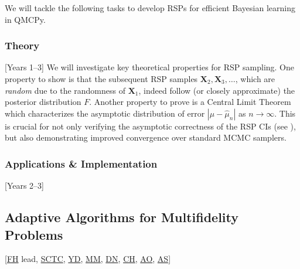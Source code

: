 \documentclass[11pt]{NSFamsart}
\newcommand{\cmtS}[1]{{\color{blue}{(Simon: #1)}}}
\newcommand{\FH}{\hyperlink{FHlink}{FH}\xspace}
\newcommand{\SM}{\hyperlink{SMlink}{SM}\xspace}
\newcommand{\SCTC}{\hyperlink{SCTClink}{SCTC}\xspace}
\newcommand{\AO}{\hyperlink{AOlink}{AO}\xspace}
\newcommand{\MM}{\hyperlink{MMlink}{MM}\xspace}
\newcommand{\CH}{\hyperlink{CHlink}{CH}\xspace}
\newcommand{\YD}{\hyperlink{YDlink}{YD}\xspace}
\newcommand{\AS}{\hyperlink{ASlink}{AS}\xspace}
\newcommand{\DN}{\hyperlink{DNlink}{DN}\xspace}
\newcommand{\bX}{{\boldsymbol{X}}}
\newcommand{\SMNote}[1]{{\color{blue}Simon: #1}}
\begin{document}
We will tackle the following tasks to develop RSPs for efficient Bayesian learning in QMCPy.
\subsubsection{Theory} [Years 1--3]
We will investigate key theoretical properties for RSP sampling. One property to show is that the subsequent RSP samples $\bX_2, \bX_3, \ldots$, which are \textit{random} due to the randomness of $\bX_1$, indeed follow (or closely approximate) the posterior distribution $F$. Another property to prove is a Central Limit Theorem which characterizes the asymptotic distribution of error $|\mu-\hat{\mu}_n|$ as $n \rightarrow \infty$. This is crucial for not only verifying the asymptotic correctness of the RSP CIs (see \cite{rosenthal2017simple}), but also demonstrating improved convergence over standard MCMC samplers.

\subsubsection{Applications \& Implementation} [Years 2--3] 
\cmtS{Discuss preliminary simulation results and ball dropping toy application. Application for turbomachinery application, where we can pull out gradients from our simulators. }





\subsection{Adaptive Algorithms for Multifidelity Problems} [\FH lead, \SCTC, \YD, \MM, \DN, \CH, \AO, \AS{}] \label{sec:performance}
\cmtS{ideas on gauging confidence, adaptive algorithms, uncertainty quantification.} \cmtS{structure: Motivation \& preliminary results, Action tasks, Application \& implementation?}
\end{document}
